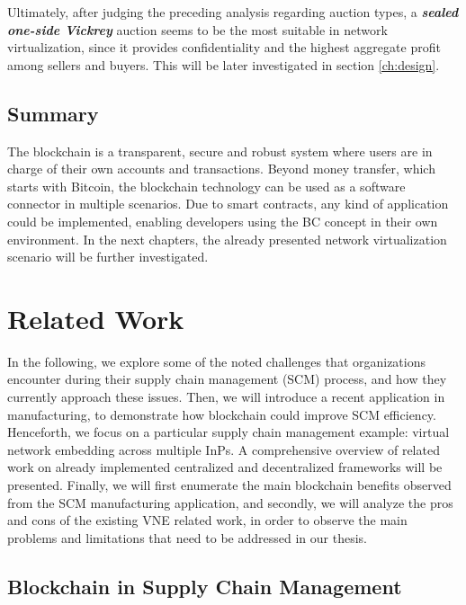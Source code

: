 Ultimately, after judging the preceding analysis regarding auction types, a \textbf{\textit{sealed one-side Vickrey}} auction seems to be the most suitable in network virtualization, since it provides confidentiality and the highest aggregate profit among sellers and buyers. This will be later investigated in section \ref{ch:design}.

\section{Summary}

The blockchain is a transparent, secure and robust system where users are in charge of their own accounts and transactions. Beyond money transfer, which starts with Bitcoin, the blockchain technology can be used as a software connector in multiple scenarios. Due to smart contracts, any kind of application could be implemented, enabling developers using the BC concept in their own environment. In the next chapters, the already presented network virtualization scenario will be further investigated.

\chapter{Related Work}
\label{ch:relatedwork}

In the following, we explore some of the noted challenges that organizations encounter during their supply chain management (SCM) process, and how they currently approach these issues. Then, we will introduce a recent application in manufacturing, to demonstrate how blockchain could improve SCM efficiency. Henceforth, we focus on a particular supply chain management example: virtual network embedding across multiple InPs. A comprehensive overview of related work on already implemented centralized and decentralized frameworks will be presented. Finally, we will first enumerate the main blockchain benefits observed from the SCM manufacturing application, and secondly, we will analyze the pros and cons of the existing VNE related work, in order to observe the main problems and limitations that need to be addressed in our thesis.

\section{Blockchain in Supply Chain Management}


